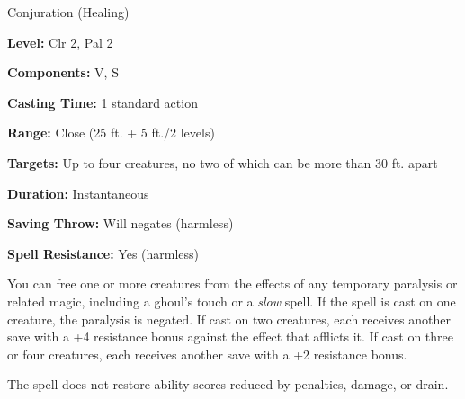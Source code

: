 
Conjuration (Healing)

\textbf{Level:} Clr 2, Pal 2

\textbf{Components:} V, S

\textbf{Casting Time:} 1 standard action

\textbf{Range:} Close (25 ft. + 5 ft./2 levels)

\textbf{Targets:} Up to four creatures, no two of which can be more than 30 ft. 
apart

\textbf{Duration:} Instantaneous

\textbf{Saving Throw:} Will negates (harmless)

\textbf{Spell Resistance:} Yes (harmless)

You can free one or more creatures from the effects of any temporary paralysis 
or related magic, including a ghoul's touch or a \textit{slow} spell. If the spell 
is cast on one creature, the paralysis is negated. If cast on two creatures, each 
receives another save with a +4 resistance bonus against the effect that afflicts 
it. If cast on three or four creatures, each receives another save with a +2 resistance 
bonus.

The spell does not restore ability scores reduced by penalties, damage, or drain.


